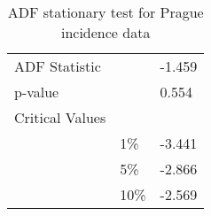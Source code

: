 \begin{table}
\begin{tabularx}{\textwidth}{XXX}
\toprule
\midrule
ADF Statistic &  & -1.459 \\
p-value &  & 0.554 \\
Critical Values &  &  \\
 & 1\% & -3.441 \\
 & 5\% & -2.866 \\
 & 10\% & -2.569 \\
\bottomrule
\end{tabularx}
\caption{ADF stationary test for Prague incidence data}
\label{tab:adf_test_prague}
\end{table}
